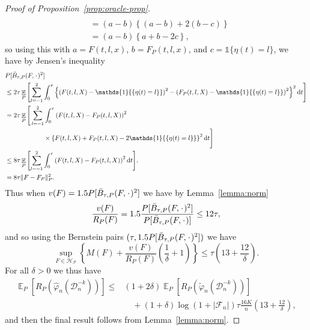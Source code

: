\documentclass[a4paper,danish]{article}
\theoremstyle{plain} %
\numberwithin{theorem}{section}
\theoremstyle{definition} %
\theoremstyle{remark}
\DeclareMathOperator{\E}{\mathbb{E}} %
\newcommand{\blank}{\makebox[1ex]{\textbf{$\cdot$}}}
\renewcommand{\phi}{\varphi}
\newcommand*\diff{\mathop{}\!\mathrm{d}}
\newcommand{\1}{\mathds{1}}
\newcommand{\data}{\ensuremath{\mathcal{D}}}
\begin{document}
\begin{proof}[Proof of Proposition~\ref{prop:oracle-prop}]
\begin{align*}
  \\
  & = (a-b)
    \left\{
    (a-b) +  2(b-c)
    \right\}
  \\
  & = (a-b)
    \left\{
     a + b -2c
    \right\},
\end{align*}
so using this with \( a=F(t, l, x) \), \( b=F_P(t, l, x) \), and
\( c = \1{\{\eta(t) = l\}} \), we have by Jensen's inequality
\begin{align*}
  & P{[\bar{B}_{\tau,P}(F, \blank)^2]}
  \\
  & \leq
    2\tau\E_{P}{\left[
    \sum_{l=-1}^{2} \int_0^{\tau}
    \left\{
    \left(
    F(t, l, X) - \1{\{\eta(t) = l\}}
    \right)^2
    -
    \left(
    F_P(t, l, X) - \1{\{\eta(t) = l\}}
    \right)^2
    \right\}^2
    \diff t 
    \right]}
  \\
  & =2\tau
    \E_{P}\Bigg[
    \sum_{l=-1}^{2} \int_0^{\tau}
    \left(
    F(t, l, X) - F_P(t, l, X)
    \right)^2
  \\
  & \quad \quad \quad\quad \quad \quad \times
    \left\{
    F(t, l, X) +  F_P(t, l, X)-2 \1{\{\eta(t) = l\}}
    \right\}^2
    \diff t 
    \Bigg]
  \\
  & \leq
    8\tau \E_{P}{\left[
    \sum_{l=-1}^{2} \int_0^{\tau}
    \left(
    F(t, l, X) - F_P(t, l, X)
    \right)^2
    \diff t 
    \right]}.
  \\
  & =
    8\tau \Vert F - F_P \Vert_{P}^2.
\end{align*}
Thus when \( v(F) = 1.5 P{[\bar{B}_{\tau,P}(F, \blank)^2]} \) we have by
Lemma~\ref{lemma:norm}
\begin{equation*}
  \frac{v(F)}{R_P(F)}
  = 1.5 \frac{P{[\bar{B}_{\tau,P}(F, \blank)^2]}}{P{[\bar{B}_{\tau,P}(F, \blank)]}}
  \leq 12 \tau,
\end{equation*}
and so using the Bernstein pairs \( (\tau, 1.5 P{[\bar{B}_{\tau,P}(F, \blank)^2]}) \) we have
\begin{equation*}
  \sup_{F \in \mathcal{H}_{\mathcal{P}}}
  \left\{
    M(F) + \frac{v(F)}{R_P(F)}
    \left(
      \frac{1}{\delta} + 1
    \right)
  \right\}
  \leq \tau
  \left(
    13 + \frac{12}{\delta}
  \right).
\end{equation*}
For all $\delta>0$ we thus have
\begin{align*}
  \E_{P}{\left[ R_P(\hat{\phi}_n(\data_n^{-k})) \right]}
  \leq
  &(1+2\delta)\E_{P}{\left[ R_P(\tilde{\phi}_n(\data_n^{-k})) \right]}
  \\
  & \quad
    + (1+\delta)\log(1 + |\mathcal{F}_n|) \tau \frac{16 K}{n}
    \left(
    13 + \frac{12}{\delta}
    \right),
\end{align*}
and then the final result follows from Lemma~\ref{lemma:norm}.
\end{proof}
\end{document}
